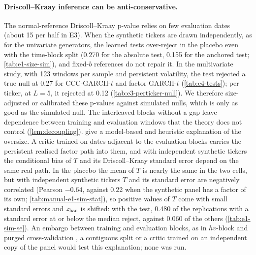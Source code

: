 \paragraph{Driscoll--Kraay inference can be anti-conservative.}
The normal-reference Driscoll--Kraay p-value relies on few evaluation dates (about 15 per half in
E3). When the synthetic tickers are drawn independently, as for the univariate generators, the
learned tests over-reject in the placebo even with the time-block split (0.270 for the absolute
\WC{} test, 0.155 for the anchored test; \cref{tab:e1-size-sim}), and fixed-$b$ references do not
repair it. In the multivariate study, with 123 windows per sample and persistent volatility, the
\WC{} test rejected a true null at 0.27 for CCC-GARCH-$t$ and factor GARCH-$t$
(\cref{tab:e4-tests}); per ticker, at $L=5$, it rejected at 0.12 (\cref{tab:e3-perticker-null}).
We therefore size-adjusted or calibrated these p-values against simulated nulls, which is only as
good as the simulated null. The interleaved blocks without a gap leave dependence between
training and evaluation windows that the theory does not control (\cref{lem:decoupling}).
 give a model-based and heuristic explanation of the oversize. A
critic trained on dates adjacent to the evaluation blocks carries the persistent realised factor
path into them, and with independent synthetic tickers the conditional bias of $T$ and its
Driscoll--Kraay standard error depend on the same real path. In the placebo the mean of $T$ is
nearly the same in the two cells, but with independent synthetic tickers $T$ and its standard
error are negatively correlated (Pearson $-0.64$, against 0.22 when the synthetic panel has a
factor of its own; \cref{tab:manual-e1-sim-stat}), so positive values of $T$ come with small standard errors and
$z_{\mathrm{hac}}$ is shifted: with the \WC{} test, 0.480 of the replications with a standard error at or
below the median reject, against 0.060 of the others (\cref{tab:e1-sim-se}). An embargo between
training and evaluation blocks, as in $hv$-block and purged cross-validation
\citep{racine_2000_consistent,lopezdeprado_2018_advances}, a contiguous split or a critic trained
on an independent copy of the panel would test this explanation; none was run.

